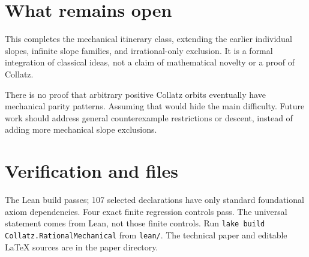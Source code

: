 \documentclass[10pt]{article}
\begin{document}
\section*{What remains open}
This completes the mechanical itinerary class, extending the earlier
individual slopes, infinite slope families, and irrational-only exclusion.
It is a formal integration of classical ideas, not a claim of mathematical
novelty or a proof of Collatz.

There is no proof that arbitrary positive Collatz orbits eventually have
mechanical parity patterns. Assuming that would hide the main difficulty.
Future work should address general counterexample restrictions or descent,
instead of adding more mechanical slope exclusions.

\section*{Verification and files}
The Lean build passes; 107 selected declarations have only standard
foundational axiom dependencies. Four exact finite regression controls pass.
The universal statement comes from Lean, not those finite controls.
Run \texttt{lake build Collatz.RationalMechanical} from \texttt{lean/}.
The technical paper and editable LaTeX sources are in the paper directory.
\end{document}
